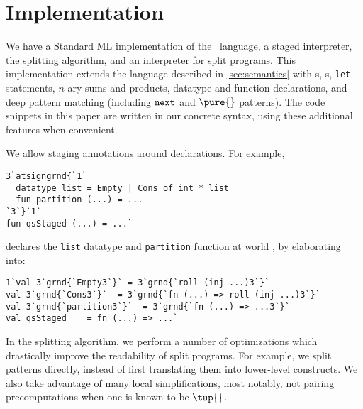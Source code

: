 
\section {Implementation}
\label{sec:implementation}

\begin{abstrsyn}
We have a Standard ML implementation of the \lang\ language, a staged
interpreter, the splitting algorithm, and an interpreter for split programs.
This implementation extends the language described in \ref{sec:semantics} with 
\rmint{}s,
\rmbool{}s,
\texttt{let} statements,
$n$-ary sums and products,
datatype and function declarations, and
deep pattern matching (including ${\tt next}{}$ and $\pure{}$ patterns).
The code snippets in this paper are written in our concrete syntax, using 
these additional features when convenient.

We allow staging annotations around declarations. For example,
\begin{lstlisting}
3`atsigngrnd{`1`
  datatype list = Empty | Cons of int * list
  fun partition (...) = ...
`3`}`1`
fun qsStaged (...) = ...`
\end{lstlisting}
declares the \texttt{list} datatype and \texttt{partition} function at world \bbonep,
by elaborating into:
\begin{lstlisting}
1`val 3`grnd{`Empty3`}` = 3`grnd{`roll (inj ...)3`}`
val 3`grnd{`Cons3`}`  = 3`grnd{`fn (...) => roll (inj ...)3`}`
val 3`grnd{`partition3`}`  = 3`grnd{`fn (...) => ...3`}`
val qsStaged    = fn (...) => ...`
\end{lstlisting}

In the splitting algorithm, we perform a number of optimizations which
drastically improve the readability of split programs. For example, we split
patterns directly, instead of first translating them into lower-level
constructs. We also take advantage of many local simplifications, most notably,
not pairing precomputations when one is known to be $\tup{}$.




\end{abstrsyn}
